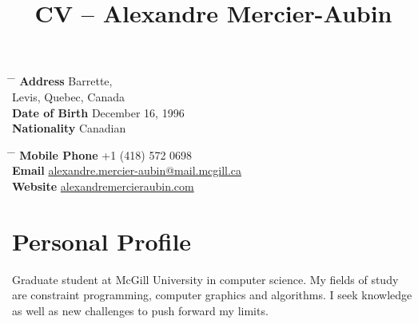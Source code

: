 \documentclass[10pt]{article} %
\begin{document}

\title{CV -- Alexandre Mercier-Aubin} %


\parbox{0.5\textwidth}{ %
\begin{tabbing} %
\hspace{3cm} \= \hspace{4cm} \= \kill %
{\bf Address}  Barrette,\\ %
\> Levis, Quebec, Canada \\ %
{\bf Date of Birth} \> December 16, 1996 \\ %
{\bf Nationality} \> Canadian %
\end{tabbing}}
\hfill %
\parbox{0.5\textwidth}{ %
\begin{tabbing} %
\hspace{3cm} \= \hspace{4cm} \= \kill %
{\bf Mobile Phone} \> +1 (418) 572 0698 \\ %
{\bf Email} \> \href{mailto:alexandre.mercier-aubin@mail.mcgill.ca}{alexandre.mercier-aubin@mail.mcgill.ca} \\ %
{\bf Website} \> \href{alexandremercieraubin.github.io}{alexandremercieraubin.com} \\
\end{tabbing}}


\section{Personal Profile}

Graduate student at McGill University in computer science. My fields of study are constraint programming, computer graphics and algorithms. I seek knowledge as well as new challenges to push forward my limits.

\end{document}
